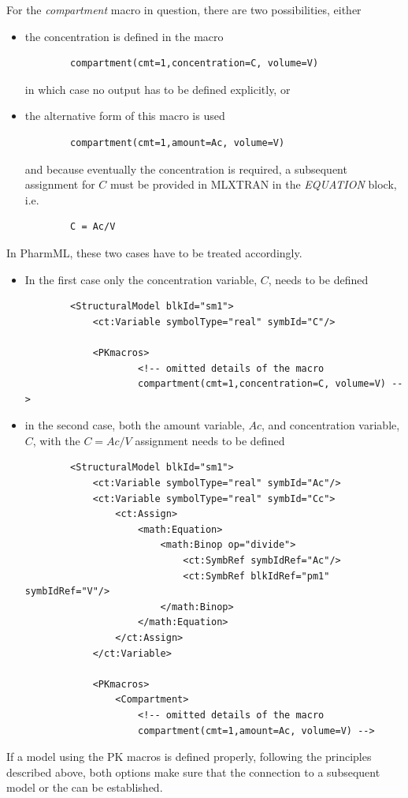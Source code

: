 For the \emph{compartment} macro in question, there are two possibilities, either
\begin{itemize}
\item
the concentration is defined in the macro
\lstset{language=NONMEMdataSet}
\begin{lstlisting}
		compartment(cmt=1,concentration=C, volume=V)
\end{lstlisting}
in which case no output has to be defined explicitly, or
\item
the alternative form of this macro is used
\lstset{language=NONMEMdataSet}
\begin{lstlisting}
		compartment(cmt=1,amount=Ac, volume=V)
\end{lstlisting}
and because eventually the concentration is required, a subsequent assignment for $C$ must be provided in MLXTRAN
in the \emph{EQUATION} block, i.e.
\lstset{language=NONMEMdataSet}
\begin{lstlisting}
		C = Ac/V
\end{lstlisting}
\end{itemize}
In PharmML, these two cases have to be treated accordingly. 
\begin{itemize}
\item
In the first case only the concentration variable, $C$, needs to be defined
\lstset{language=XML}
\begin{lstlisting}
        <StructuralModel blkId="sm1">
            <ct:Variable symbolType="real" symbId="C"/>
            
            <PKmacros>
                    <!-- omitted details of the macro 
                    compartment(cmt=1,concentration=C, volume=V) -->
\end{lstlisting}
\item
in the second case, both the amount variable, $Ac$, and concentration variable, $C$, 
with the $C=Ac/V$ assignment needs to be defined
\lstset{language=XML}
\begin{lstlisting}
        <StructuralModel blkId="sm1">
            <ct:Variable symbolType="real" symbId="Ac"/>
            <ct:Variable symbolType="real" symbId="Cc">
                <ct:Assign>
                    <math:Equation>
                        <math:Binop op="divide">
                            <ct:SymbRef symbIdRef="Ac"/>
                            <ct:SymbRef blkIdRef="pm1" symbIdRef="V"/>
                        </math:Binop>
                    </math:Equation>
                </ct:Assign>
            </ct:Variable>
            
            <PKmacros>
                <Compartment>
                    <!-- omitted details of the macro 
                    compartment(cmt=1,amount=Ac, volume=V) -->
\end{lstlisting}
\end{itemize}
If a model using the PK macros is defined properly, following the principles described above, 
both options make sure that the connection to a subsequent model or the  
can be established.



